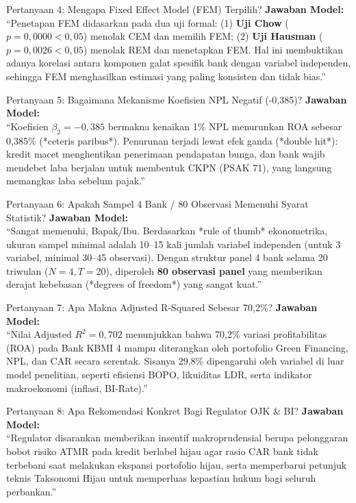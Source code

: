 \documentclass[11pt,a4paper]{article}
\begin{document}
\begin{qnabox}{Pertanyaan 4: Mengapa Fixed Effect Model (FEM) Terpilih?}
\textbf{Jawaban Model:}\\
``Penetapan FEM didasarkan pada dua uji formal: (1) \textbf{Uji Chow} ($p = 0{,}0000 < 0{,}05$) menolak CEM dan memilih FEM; (2) \textbf{Uji Hausman} ($p = 0{,}0026 < 0{,}05$) menolak REM dan menetapkan FEM. Hal ini membuktikan adanya korelasi antara komponen galat spesifik bank dengan variabel independen, sehingga FEM menghasilkan estimasi yang paling konsisten dan tidak bias.''
\end{qnabox}

\begin{qnabox}{Pertanyaan 5: Bagaimana Mekanisme Koefisien NPL Negatif (-0,385)?}
\textbf{Jawaban Model:}\\
``Koefisien $\beta_2 = -0{,}385$ bermakna kenaikan 1\% NPL menurunkan ROA sebesar 0,385\% (*ceteris paribus*). Penurunan terjadi lewat efek ganda (*double hit*): kredit macet menghentikan penerimaan pendapatan bunga, dan bank wajib mendebet laba berjalan untuk membentuk CKPN (PSAK 71), yang langsung memangkas laba sebelum pajak.''
\end{qnabox}

\begin{qnabox}{Pertanyaan 6: Apakah Sampel 4 Bank / 80 Observasi Memenuhi Syarat Statistik?}
\textbf{Jawaban Model:}\\
``Sangat memenuhi, Bapak/Ibu. Berdasarkan *rule of thumb* ekonometrika, ukuran sampel minimal adalah 10--15 kali jumlah variabel independen (untuk 3 variabel, minimal 30--45 observasi). Dengan struktur panel 4 bank selama 20 triwulan ($N=4, T=20$), diperoleh \textbf{80 observasi panel} yang memberikan derajat kebebasan (*degrees of freedom*) yang sangat kuat.''
\end{qnabox}

\begin{qnabox}{Pertanyaan 7: Apa Makna Adjusted R-Squared Sebesar 70,2\%?}
\textbf{Jawaban Model:}\\
``Nilai $\text{Adjusted } R^2 = 0{,}702$ menunjukkan bahwa 70,2\% variasi profitabilitas (ROA) pada Bank KBMI 4 mampu diterangkan oleh portofolio Green Financing, NPL, dan CAR secara serentak. Sisanya 29,8\% dipengaruhi oleh variabel di luar model penelitian, seperti efisiensi BOPO, likuiditas LDR, serta indikator makroekonomi (inflasi, BI-Rate).''
\end{qnabox}

\begin{qnabox}{Pertanyaan 8: Apa Rekomendasi Konkret Bagi Regulator OJK \& BI?}
\textbf{Jawaban Model:}\\
``Regulator disarankan memberikan insentif makroprudensial berupa pelonggaran bobot risiko ATMR pada kredit berlabel hijau agar rasio CAR bank tidak terbebani saat melakukan ekspansi portofolio hijau, serta memperbarui petunjuk teknis Taksonomi Hijau untuk memperluas kepastian hukum bagi seluruh perbankan.''
\end{qnabox}
\end{document}
